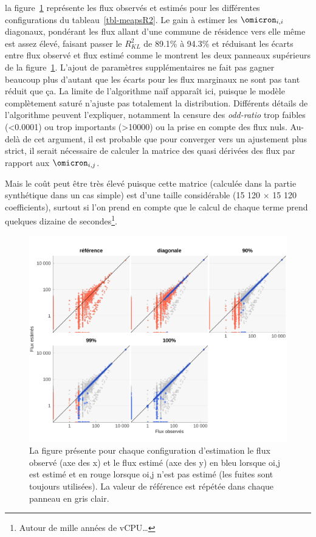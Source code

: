 \documentclass[
  10pt,
  a4paper,
  numbers=noendperiod,
  DIV=9]{scrreprt}
\begin{document}
la figure~\ref{fig-actvsfit} représente les flux observés et estimés
pour les différentes configurations du tableau~\ref{tbl-meapsR2}. Le
gain à estimer les \(\omicron_{i,i}\) diagonaux, pondérant les flux
allant d'une commune de résidence vers elle même est assez élevé,
faisant passer le \(R^2_{KL}\) de 89.1\% à 94.3\% et réduisant les
écarts entre flux observé et flux estimé comme le montrent les deux
panneaux supérieurs de la figure~\ref{fig-actvsfit}. L'ajout de
paramètres supplémentaires ne fait pas gagner beaucoup plus d'autant que
les écarts pour les flux marginaux ne sont pas tant réduit que ça. La
limite de l'algorithme naïf apparaît ici, puisque le modèle complètement
saturé n'ajuste pas totalement la distribution. Différents détails de
l'algorithme peuvent l'expliquer, notamment la censure des
\emph{odd-ratio} trop faibles (\textless0.0001) ou trop importants
(\textgreater10000) ou la prise en compte des flux nuls. Au-delà de cet
argument, il est probable que pour converger vers un ajustement plus
strict, il serait nécessaire de calculer la matrice des quasi dérivées
des flux par rapport aux \(\omicron_{i,j}\).

Mais le coût peut être très élevé puisque cette matrice (calculée dans
la partie synthétique dans un cas simple) est d'une taille considérable
(15 120 \(\times\) 15 120 coefficients), surtout si l'on prend en compte
que le calcul de chaque terme prend quelques dizaine de
secondes\footnote{Autour de mille années de vCPU\ldots{}}.

\begin{figure}[htb]

{\centering \includegraphics[width=1\textwidth,height=\textheight]{./output/estmeaps.png}

}

\caption[MEAPS observés versus estimés]{\label{fig-actvsfit}La figure
présente pour chaque configuration d'estimation le flux observé (axe des
x) et le flux estimé (axe des y) en bleu lorsque oi,j est estimé et en
rouge lorsque oi,j n'est pas estimé (les fuites sont toujours
utilisées). La valeur de référence est répétée dans chaque panneau en
gris clair.}

\end{figure}
\end{document}
